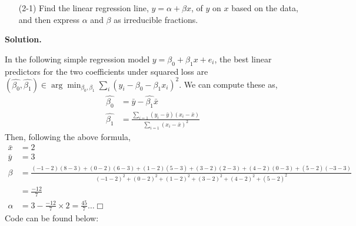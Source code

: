 \documentclass[
]{article}
\newenvironment{Shaded}{\begin{snugshade}}{\end{snugshade}}
\newcommand{\BuiltInTok}[1]{#1}
\newcommand{\ControlFlowTok}[1]{\textcolor[rgb]{0.13,0.29,0.53}{\textbf{#1}}}
\newcommand{\DecValTok}[1]{\textcolor[rgb]{0.00,0.00,0.81}{#1}}
\newcommand{\KeywordTok}[1]{\textcolor[rgb]{0.13,0.29,0.53}{\textbf{#1}}}
\newcommand{\NormalTok}[1]{#1}
\newcommand{\OperatorTok}[1]{\textcolor[rgb]{0.81,0.36,0.00}{\textbf{#1}}}
\newcommand{\SpecialCharTok}[1]{\textcolor[rgb]{0.00,0.00,0.00}{#1}}
\newcommand{\StringTok}[1]{\textcolor[rgb]{0.31,0.60,0.02}{#1}}
\begin{document}
\begin{enumerate}
\item[(2-1)] Find the linear regression line, $y = \alpha + \beta x$, of $y$ on $x$ based on the data, and then express $\alpha$ and $\beta$ as irreducible fractions.
\end{enumerate}

\textbf{Solution.}

In the following simple regression model
\(y = \beta_0 + \beta_1 x + e_i\), the best linear predictors for the
two coefficients under squared loss
are\((\hat{\beta_0}, \hat{\beta_1}) \in \arg \! \min_{\beta_0, \beta_1} \sum_i(y_i - \beta_0 - \beta_1 x_i)^2\).
We can compute these as, \[ \begin{aligned}
\hat{\beta_0} &= \bar{y} - \hat{\beta_1}\bar{x}\\
\hat{\beta_1} &= \frac{\sum_{i=1}(y_i - \bar{y})(x_i - \bar{x})}{\sum_{i=1}(x_i  - \bar{x})^2 }
\end{aligned}\] Then, following the above formula, \[\begin{aligned}
\bar{x} &= 2\\
\bar{y} &= 3\\
\beta &= \frac{(-1 - 2)(8-3) + (0 - 2)(6 - 3) + (1 - 2)(5 - 3) + (3-2)(2-3) + (4 - 2)(0 - 3) + (5 - 2)(-3 - 3)}{(-1 - 2)^2 + (0 - 2)^2 + (1 - 2)^2 + (3-2)^2 + (4 - 2)^2 + (5 - 2)^2} \\
&= \frac{-12}{7} \\
\alpha &= 3 - \frac{-12}{7} \times 2 = \frac{45}{7} \dots \Box
\end{aligned}\] Code can be found below:

\begin{Shaded}
\end{Shaded}
\end{document}
